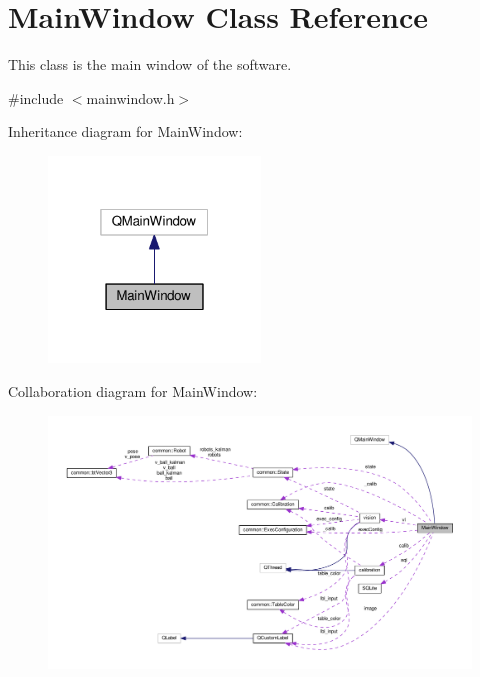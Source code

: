 \hypertarget{classMainWindow}{}\section{Main\+Window Class Reference}
\label{classMainWindow}


This class is the main window of the software.  




{\ttfamily \#include $<$mainwindow.\+h$>$}



Inheritance diagram for Main\+Window\+:\nopagebreak
\begin{figure}[H]
\begin{center}
\leavevmode
\includegraphics[width=160pt]{classMainWindow__inherit__graph}
\end{center}
\end{figure}


Collaboration diagram for Main\+Window\+:\nopagebreak
\begin{figure}[H]
\begin{center}
\leavevmode
\includegraphics[width=350pt]{classMainWindow__coll__graph}
\end{center}
\end{figure}
